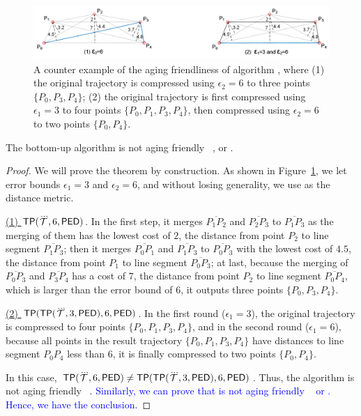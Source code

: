 \begin{figure}
	\centering
	\includegraphics[scale=0.66]{Figures/Fig-aging-pavlidis.png}

	\caption{\small A counter example of the aging friendliness of algorithm \tpa, where (1) the original trajectory is compressed using $\epsilon_2=6$ to three points $\{P_0, P_3, P_4\}$; (2) the original trajectory is first compressed using $\epsilon_1=3$ to four points $\{P_0, P_1, P_3, P_4\}$, then compressed using $\epsilon_2=6$ to two points $\{P_0, P_4\}$. }
	\vspace{-1ex}
	\label{fig:aging-pavlidis}
\end{figure}


\begin{theorem}
\label{theo-aging-tp}
The bottom-up algorithm \tpa is not aging friendly \wrt~\ped, \sed or \dad.
\end{theorem}

\begin{proof}
We will prove the theorem by construction.
As shown in Figure~\ref{fig:aging-pavlidis}, we let error bounds $\epsilon_1 =3$ and $\epsilon_2=6$, and without losing generality, we use \ped as the distance metric.

\underline{(1) ${{\mathsf{TP}}}(\dddot{\mathcal{T}}, 6, {\mathsf{PED}})$}. In the first step, it merges $\overline{P_1P_2}$ and $\overline{P_2P_3}$ to $\overline{P_1P_3}$ as the merging of them has the lowest cost of $2$, the distance from point $P_2$ to line segment $\overline{P_1P_3}$; then it merges $\overline{P_0P_1}$ and $\overline{P_1P_3}$ to $\overline{P_0P_3}$ with the lowest cost of $4.5$, the distance from point $P_1$ to line segment $\overline{P_0P_3}$; at last, because the merging of $\overline{P_0P_3}$ and $\overline{P_3P_4}$ has a cost of $7$, the distance from point $P_2$ to line segment $\overline{P_0P_4}$, which is larger than the error bound of $6$, it outputs three points $\{P_0, P_3, P_4\}$.

\underline{(2) ${{\mathsf{TP}}}({\mathsf{TP}}(\dddot{\mathcal{T}}, 3, {\mathsf{PED}}), 6, {\mathsf{PED}})$}. In the first round ($\epsilon_1=3$), the original trajectory is compressed to four points $\{P_0, P_1, P_3, P_4\}$, and in the second round ($\epsilon_1=6$), because all points in the result trajectory $\{P_0, P_1, P_3, P_4\}$ have distances to line segment $P_0P_4$ less than $6$, it is finally compressed to two points $\{P_0, P_4\}$.

In this case, ${{\mathsf{TP}}}(\dddot{\mathcal{T}}, 6, {\mathsf{PED}}) \ne {{\ensuremath {\mathsf{TP}}}}({\mathsf{TP}}(\dddot{\mathcal{T}}, 3, {\mathsf{PED}}), 6, {\mathsf{PED}})$. Thus, the \tpa algorithm is not aging friendly \wrt~\ped.
\textcolor{blue}{Similarly, we can prove that \tpa is not aging friendly \wrt~ \sed or \dad. Hence, we have the conclusion.}
\end{proof}

